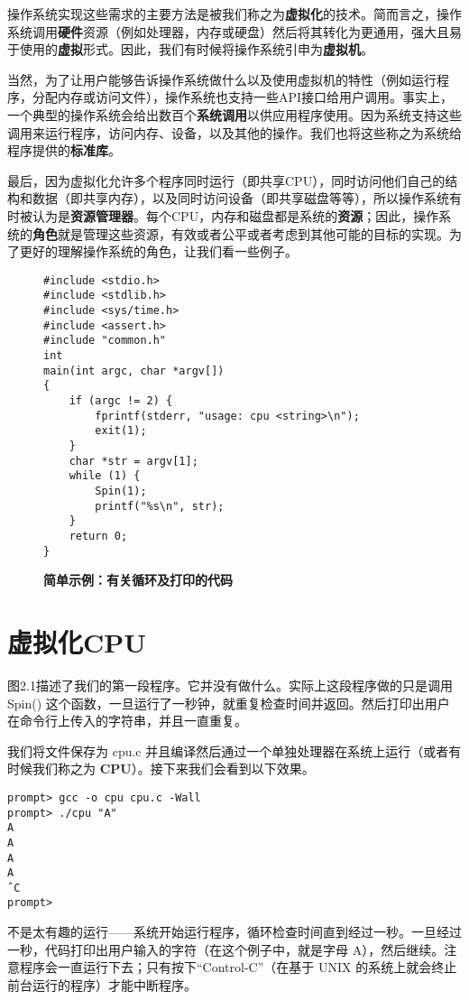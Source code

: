 操作系统实现这些需求的主要方法是被我们称之为\textbf{虚拟化}的技术。简而言之，操作系统调用\textbf{硬件}资源（例如处理器，内存或硬盘）然后将其转化为更通用，强大且易于使用的\textbf{虚拟}形式。因此，我们有时候将操作系统引申为\textbf{虚拟机}。

当然，为了让用户能够告诉操作系统做什么以及使用虚拟机的特性（例如运行程序，分配内存或访问文件），操作系统也支持一些API接口给用户调用。事实上，一个典型的操作系统会给出数百个\textbf{系统调用}以供应用程序使用。因为系统支持这些调用来运行程序，访问内存、设备，以及其他的操作。我们也将这些称之为系统给程序提供的\textbf{标准库}。

最后，因为虚拟化允许多个程序同时运行（即共享CPU），同时访问他们自己的结构和数据（即共享内存），以及同时访问设备（即共享磁盘等等），所以操作系统有时被认为是\textbf{资源管理器}。每个CPU，内存和磁盘都是系统的\textbf{资源}；因此，操作系统的\textbf{角色}就是管理这些资源，有效或者公平或者考虑到其他可能的目标的实现。为了更好的理解操作系统的角色，让我们看一些例子。

\newpage

\begin{figure}[ht]
\begin{lstlisting}  
#include <stdio.h> 
#include <stdlib.h> 
#include <sys/time.h> 
#include <assert.h> 
#include "common.h"
int
main(int argc, char *argv[])
{
    if (argc != 2) {
        fprintf(stderr, "usage: cpu <string>\n");
        exit(1);
    }
    char *str = argv[1];
    while (1) {
        Spin(1);
        printf("%s\n", str);
    }
    return 0;
}
\end{lstlisting}
\caption{\textbf{简单示例：有关循环及打印的代码}}
\end{figure}

\section{虚拟化CPU}
    
图2.1描述了我们的第一段程序。它并没有做什么。实际上这段程序做的只是调用 Spin() 这个函数，一旦运行了一秒钟，就重复检查时间并返回。然后打印出用户在命令行上传入的字符串，并且一直重复。

我们将文件保存为 cpu.c 并且编译然后通过一个单独处理器在系统上运行（或者有时候我们称之为 \textbf{CPU}）。接下来我们会看到以下效果。

\begin{verbatim}
prompt> gcc -o cpu cpu.c -Wall
prompt> ./cpu "A"
A
A
A
A
ˆC
prompt>
\end{verbatim}

不是太有趣的运行——系统开始运行程序，循环检查时间直到经过一秒。一旦经过一秒，代码打印出用户输入的字符（在这个例子中，就是字母 A），然后继续。注意程序会一直运行下去；只有按下“Control-C”（在基于 UNIX 的系统上就会终止前台运行的程序）才能中断程序。


